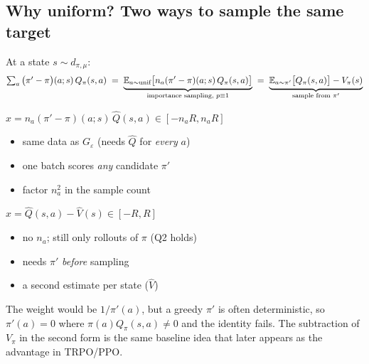 \subsection*{Why uniform? Two ways to sample the same target}

At a state $s\sim d_{\pi,\mu}$:
\begin{gather*}
  \textstyle\sum_a\big(\pi'-\pi\big)(a;s)\,Q_\pi(s,a)
  \;=\; \underbrace{\mathbb{E}_{a\sim\text{unif}}\big[n_a(\pi'-\pi)(a;s)\,Q_\pi(s,a)\big]}_{\text{importance sampling, }p\equiv1}
  \;=\; \underbrace{\mathbb{E}_{a\sim\pi'}\big[Q_\pi(s,a)\big]-V_\pi(s)}_{\text{sample from }\pi'}
\end{gather*}

\begin{pair}
\begin{coolbox}[title={CPI: $a$ uniform, one rollout of $\pi$}]
\small $x=n_a(\pi'-\pi)(a;s)\,\hat Q(s,a)\in[-n_aR,n_aR]$
\begin{itemize}
  \item[$+$] same data as $G_\varepsilon$ (needs $\hat Q$ for \emph{every} $a$)
  \item[$+$] one batch scores \emph{any} candidate $\pi'$
  \item[$-$] factor $n_a^2$ in the sample count
\end{itemize}
\end{coolbox}
\begin{slatebox}[title={Alternative: $a\sim\pi'$, rollouts of $\pi$}]
\small $x=\hat Q(s,a)-\hat V(s)\in[-R,R]$
\begin{itemize}
  \item[$+$] no $n_a$; still only rollouts of $\pi$ (Q2 holds)
  \item[$-$] needs $\pi'$ \emph{before} sampling
  \item[$-$] a second estimate per state ($\hat V$)
\end{itemize}
\end{slatebox}
\end{pair}

\begin{warnbox}[title={Not plain IS with $q=\pi'$}]
The weight would be $1/\pi'(a)$, but a greedy $\pi'$ is often deterministic, so $\pi'(a)=0$ where $\pi(a)Q_\pi(s,a)\neq0$ and the identity fails. The subtraction of $V_\pi$ in the second form is the same baseline idea that later appears as the advantage in TRPO/PPO.
\end{warnbox}

